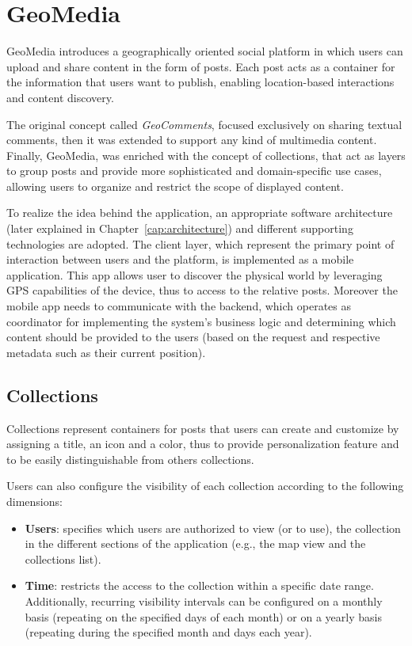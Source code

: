 
\chapter{GeoMedia}
\label{cap:geomedia}

GeoMedia introduces a geographically oriented social platform in which users can upload and share content in the form of posts. Each post acts as a container for the information that users want to publish, enabling location-based interactions and content discovery.


The original concept called \textit{GeoComments}, focused exclusively on sharing textual comments, then it was extended to support any kind of multimedia content. Finally, GeoMedia, was enriched with the concept of collections, that act as layers to group posts and provide more sophisticated and domain-specific use cases, allowing users to organize and restrict the scope of displayed content. 

To realize the idea behind the application, an appropriate software architecture (later explained in Chapter~\ref{cap:architecture}) and different supporting technologies are adopted. The client layer, which represent the primary point of interaction between users and the platform, is implemented as a mobile application. This app allows user to discover the physical world by leveraging GPS capabilities of the device, thus to access to the relative posts. Moreover the mobile app needs to communicate with the backend, which operates as coordinator for implementing the system's business logic and determining which content should be provided to the users (based on the request and respective metadata such as their current position).

\section{Collections}

Collections represent containers for posts that users can create and customize by assigning a title, an icon and a color, thus to provide personalization feature and to be easily distinguishable from others collections.

Users can also configure the visibility of each collection according to the following dimensions:

\begin{itemize}
    \item \textbf{Users}: specifies which users are authorized to view (or to use), the collection in the different sections of the application (e.g., the map view and the collections list).
    \item \textbf{Time}: restricts the access to the collection within a specific date range. Additionally, recurring visibility intervals can be configured on a monthly basis (repeating on the specified days of each month) or on a yearly basis (repeating during the specified month and days each year).
\end{itemize}

